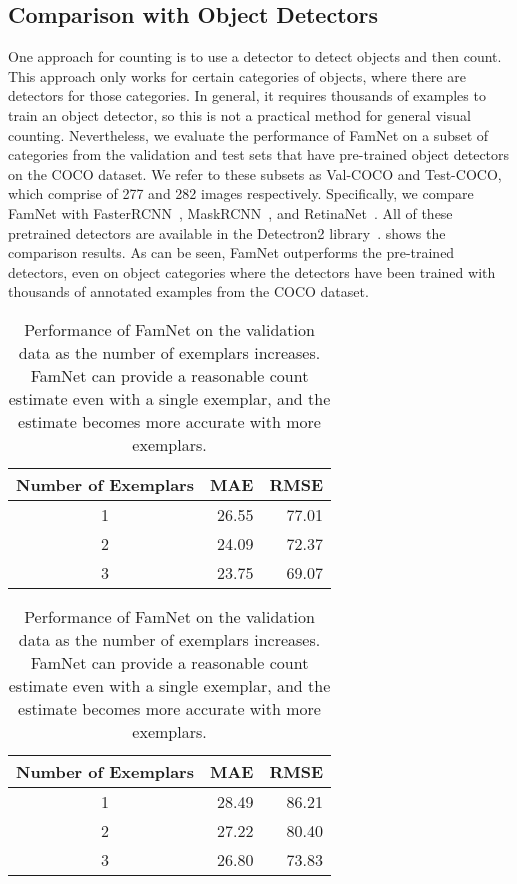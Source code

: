 \subsection{Comparison with Object Detectors}
One approach for counting is to use a detector to detect objects and then count. This approach only works for certain categories of objects, where there are detectors for those categories. In general, it requires thousands of examples to train an object detector, so this is not a practical method for general visual counting. Nevertheless, we evaluate the performance of FamNet on a subset of categories from the validation and test sets that have pre-trained object detectors on the COCO dataset. We refer to these subsets as Val-COCO and Test-COCO, which comprise of 277 and 282 images respectively. Specifically, we compare FamNet with FasterRCNN~\cite{Ren-etal-NIPS15}, MaskRCNN~\cite{He-etal-ICCV17}, and RetinaNet~\cite{lin2017focal}. All of these pretrained detectors are available in the Detectron2 library~\cite{wu2019detectron2}.  shows the comparison results. As can be seen, FamNet outperforms the pre-trained detectors, even on object categories where the detectors have been trained with thousands of annotated examples from the COCO dataset. 
\setlength{\tabcolsep}{10pt}
\begin{table}[!t]
\centering
\begin{tabular}{crr}
\toprule
Number of Exemplars & MAE & RMSE \\
\midrule 
1 & 26.55 & 77.01 \\
2 & 24.09 & 72.37 \\
3 & 23.75 & 69.07 \\
\bottomrule 
\end{tabular}
\vskip -0.1in
\caption{{Performance of FamNet on the validation data as the number of exemplars increases}. FamNet can provide a reasonable count estimate even with a single exemplar, and the estimate becomes more accurate with more exemplars.  
\label{tab:NoExemplars}}
\end{table}

\iffalse
\setlength{\tabcolsep}{10pt}
\begin{table}[!t]
\centering
\begin{tabular}{crr}
\toprule
Number of Exemplars & MAE & RMSE \\
\midrule 
1 & 28.49 & 86.21\\
2 & 27.22 & 80.40 \\
3 & 26.80 & 73.83 \\
\bottomrule 
\end{tabular}
\vskip -0.1in
\caption{{Performance of FamNet on the validation data as the number of exemplars increases}. FamNet can provide a reasonable count estimate even with a single exemplar, and the estimate becomes more accurate with more exemplars.  
\label{tab:NoExemplars}}
\end{table}

